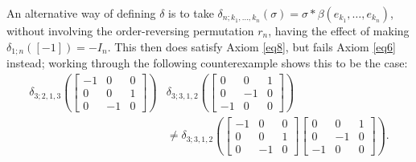 \begin{example}
An alternative way of defining $\delta$ is to take $\delta_{n;k_1,\ldots,k_n}(\sigma) = \sigma \ast \beta(e_{k_1},\ldots,e_{k_n})$, without involving the order-reversing permutation $r_n$, having the effect of making $\delta_{1;n}([-1]) = -I_n$. This then does satisfy Axiom \ref{eq8}, but fails Axiom \ref{eq6} instead; working through the following counterexample shows this to be the case:
  \begin{align*}
    \delta_{3;2,1,3}\left(
    \begin{bmatrix}
    -1 & 0 & 0 \\
    0 & 0 & 1 \\
    0 & -1 & 0
    \end{bmatrix}
    \right)
    &\delta_{3;3,1,2}\left(
    \begin{bmatrix}
    0 & 0 & 1 \\
    0 & -1 & 0 \\
    -1 & 0 & 0
    \end{bmatrix}
    \right)\\
    &\neq
    \delta_{3;3,1,2}\left(
    \begin{bmatrix}
    -1 & 0 & 0 \\
    0 & 0 & 1 \\
    0 & -1 & 0
    \end{bmatrix}
    \begin{bmatrix}
    0 & 0 & 1 \\
    0 & -1 & 0 \\
    -1 & 0 & 0
    \end{bmatrix}
    \right).
  \end{align*}
\end{example}

